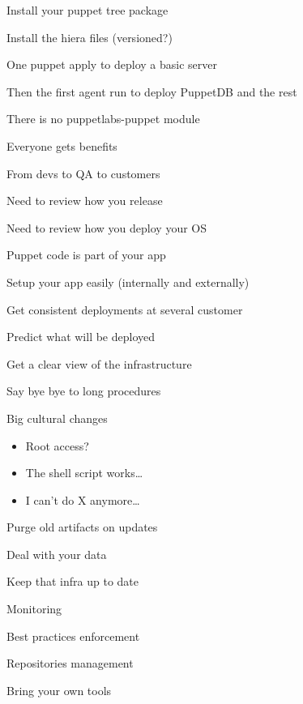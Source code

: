 \begin{iframe}
\item Install your puppet tree package
\item Install the hiera files (versioned?)
\item One puppet apply to deploy a basic server
\item Then the first agent run to deploy PuppetDB and the rest
\item There is no puppetlabs-puppet module
\end{iframe}


\begin{iframe}
\item Everyone gets benefits
\item From devs to QA to customers
\item Need to review how you release
\item Need to review how you deploy your OS
\item Puppet code is part of your app
\end{iframe}
\begin{iframe}[Advantages]
\item Setup your app easily (internally and externally)
\item Get consistent deployments at several customer
\item Predict what will be deployed
\item Get a clear view of the infrastructure
\item Say bye bye to long procedures
\end{iframe}
\begin{iframe}
\item Big cultural changes
    \begin{itemize}
        \item Root access?
        \item The shell script works\dots
        \item I can't do X anymore\dots
    \end{itemize}
\item Purge old artifacts on updates
\item Deal with your data
\item Keep that infra up to date
\end{iframe}

\begin{iframe}
\item Monitoring
\item Best practices enforcement
\item Repositories management
\item Bring your own tools
\end{iframe}

\thankyouSlide
\renewcommand{\insertLogo}{}
\contactSlide
